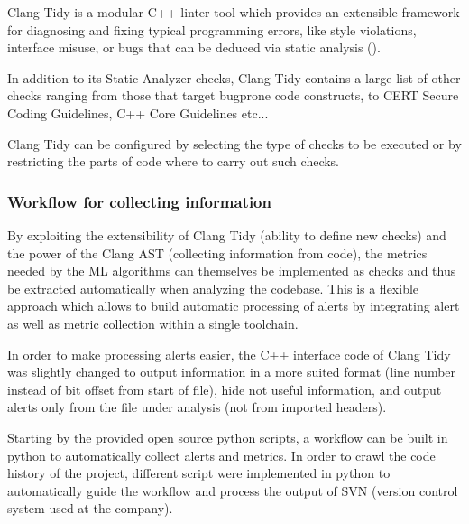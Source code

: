 \documentclass{article}
\begin{document}
Clang Tidy is a modular C++ linter tool which provides an extensible framework for diagnosing and fixing typical programming errors, like style violations, interface misuse, or bugs that can be deduced via static analysis (\cite{clang_tidy}). 

In addition to its Static Analyzer checks, Clang Tidy contains a large list of other checks ranging from those that target bugprone code constructs, to CERT Secure Coding Guidelines, C++ Core Guidelines etc...

Clang Tidy can be configured by selecting the type of checks to be executed or by restricting the parts of code where to carry out such checks.

\subsubsection{Workflow for collecting information \label{data_collection}}

By exploiting the extensibility of Clang Tidy (ability to define new checks) and the power of the Clang AST (collecting information from code), the metrics needed by the ML algorithms can themselves be implemented as checks and thus be extracted automatically when analyzing the codebase. This is a flexible approach which allows to build automatic processing of alerts by integrating alert as well as metric collection within a single toolchain.

In order to make processing alerts easier, the C++ interface code of Clang Tidy was slightly changed to output information in a more suited format (line number instead of bit offset from start of file), hide not useful information, and output alerts only from the file under analysis (not from imported headers).

Starting by the provided open source \href{https://github.com/llvm-mirror/clang-tools-extra/blob/master/clang-tidy/tool/run-clang-tidy.py}{python scripts}, a workflow can be built in python to automatically collect alerts and metrics. In order to crawl the code history of the project, different script were implemented in python to automatically guide the workflow and process the output of SVN (version control system used at the company).
\end{document}
